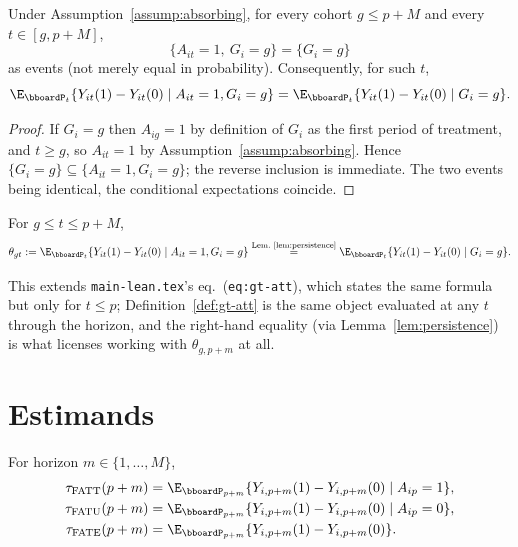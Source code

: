 \documentclass{article}
\renewcommand{\P}{\bboardP}
\begin{document}
\begin{lemma}
\label{lem:persistence}
Under Assumption~\ref{assump:absorbing}, for every cohort $g \leq p+M$ and every $t \in [g, p+M]$,
\[
\{A_{it} = 1,\ G_i = g\} = \{G_i = g\}
\]
as events (not merely equal in probability). Consequently, for such $t$,
\[
\E_{\P_t}\{Y_{it}(1) - Y_{it}(0) \mid A_{it}=1, G_i=g\} = \E_{\P_t}\{Y_{it}(1) - Y_{it}(0) \mid G_i=g\}.
\]
\end{lemma}

\begin{proof}
If $G_i = g$ then $A_{ig}=1$ by definition of $G_i$ as the first period of treatment, and $t \geq g$, so $A_{it}=1$ by Assumption~\ref{assump:absorbing}. Hence $\{G_i=g\} \subseteq \{A_{it}=1, G_i=g\}$; the reverse inclusion is immediate. The two events being identical, the conditional expectations coincide.
\end{proof}

\begin{definition}
\label{def:gt-att}
For $g \leq t \leq p+M$,
\[
\theta_{gt} := \E_{\P_t}\{Y_{it}(1) - Y_{it}(0) \mid A_{it}=1, G_i=g\} \overset{\text{Lem.~\ref{lem:persistence}}}{=} \E_{\P_t}\{Y_{it}(1) - Y_{it}(0) \mid G_i = g\}.
\]
\end{definition}

This extends \texttt{main-lean.tex}'s eq.~(\texttt{eq:gt-att}), which states the same formula but only for $t \leq p$; Definition~\ref{def:gt-att} is the same object evaluated at any $t$ through the horizon, and the right-hand equality (via Lemma~\ref{lem:persistence}) is what licenses working with $\theta_{g,p+m}$ at all.

\section{Estimands}
\label{sec:estimands}

\begin{definition}
\label{def:estimands}
For horizon $m \in \{1,\ldots,M\}$,
\begin{align}
\tau_{\mathrm{FATT}}(p+m) &= \E_{\P_{p+m}}\{Y_{i,p+m}(1) - Y_{i,p+m}(0) \mid A_{ip}=1\}, \\
\tau_{\mathrm{FATU}}(p+m) &= \E_{\P_{p+m}}\{Y_{i,p+m}(1) - Y_{i,p+m}(0) \mid A_{ip}=0\}, \\
\tau_{\mathrm{FATE}}(p+m) &= \E_{\P_{p+m}}\{Y_{i,p+m}(1) - Y_{i,p+m}(0)\}.
\end{align}
\end{definition}
\end{document}
